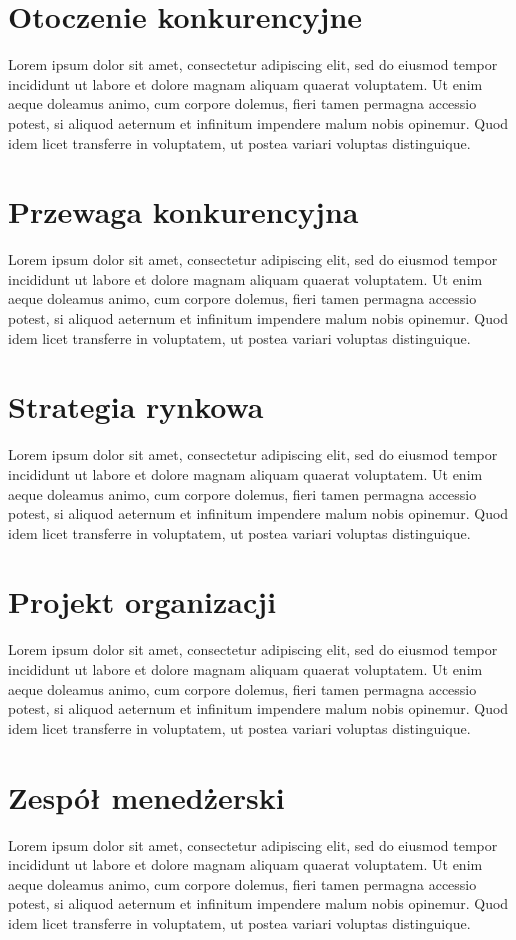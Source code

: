     
\section{Otoczenie konkurencyjne}

Lorem ipsum dolor sit amet, consectetur adipiscing elit, sed do eiusmod tempor incididunt ut labore et dolore magnam aliquam quaerat voluptatem. Ut enim aeque doleamus animo, cum corpore dolemus, fieri tamen permagna accessio potest, si aliquod aeternum et infinitum impendere malum nobis opinemur. Quod idem licet transferre in voluptatem, ut postea variari voluptas distinguique.

\section{Przewaga konkurencyjna}

Lorem ipsum dolor sit amet, consectetur adipiscing elit, sed do eiusmod tempor incididunt ut labore et dolore magnam aliquam quaerat voluptatem. Ut enim aeque doleamus animo, cum corpore dolemus, fieri tamen permagna accessio potest, si aliquod aeternum et infinitum impendere malum nobis opinemur. Quod idem licet transferre in voluptatem, ut postea variari voluptas distinguique.

\section{Strategia rynkowa}

Lorem ipsum dolor sit amet, consectetur adipiscing elit, sed do eiusmod tempor incididunt ut labore et dolore magnam aliquam quaerat voluptatem. Ut enim aeque doleamus animo, cum corpore dolemus, fieri tamen permagna accessio potest, si aliquod aeternum et infinitum impendere malum nobis opinemur. Quod idem licet transferre in voluptatem, ut postea variari voluptas distinguique.

\section{Projekt organizacji}

Lorem ipsum dolor sit amet, consectetur adipiscing elit, sed do eiusmod tempor incididunt ut labore et dolore magnam aliquam quaerat voluptatem. Ut enim aeque doleamus animo, cum corpore dolemus, fieri tamen permagna accessio potest, si aliquod aeternum et infinitum impendere malum nobis opinemur. Quod idem licet transferre in voluptatem, ut postea variari voluptas distinguique.

\section{Zespół menedżerski}

Lorem ipsum dolor sit amet, consectetur adipiscing elit, sed do eiusmod tempor incididunt ut labore et dolore magnam aliquam quaerat voluptatem. Ut enim aeque doleamus animo, cum corpore dolemus, fieri tamen permagna accessio potest, si aliquod aeternum et infinitum impendere malum nobis opinemur. Quod idem licet transferre in voluptatem, ut postea variari voluptas distinguique.